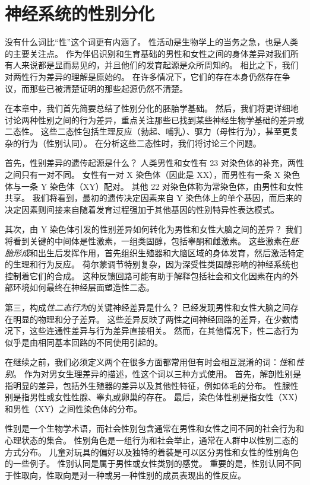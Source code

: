 \chapter{神经系统的性别分化} \label{chap:chap51}

没有什么词比“性”这个词更有内涵了。
性活动是生物学上的当务之急，也是人类的主要关注点。
作为伴侣识别和生育基础的男性和女性之间的身体差异对我们所有人来说都是显而易见的，并且他们的发育起源是众所周知的。
相比之下，我们对两性行为差异的理解是原始的。
在许多情况下，它们的存在本身仍然存在争议，而那些已被清楚证明的那些起源仍然不清楚。


在本章中，我们首先简要总结了性别分化的胚胎学基础。
然后，我们将更详细地讨论两种性别之间的行为差异，重点关注那些已找到某些神经生物学基础的差异或二态性。
这些二态性包括生理反应（勃起、哺乳）、驱力（母性行为），甚至更复杂的行为（性别认同）。
在分析这些二态性时，我们将讨论三个问题。


首先，性别差异的遗传起源是什么？
人类男性和女性有 23 对染色体的补充，两性之间只有一对不同。
女性有一对 X 染色体（因此是 XX），而男性有一条 X 染色体与一条 Y 染色体（XY）配对。
其他 22 对染色体称为常染色体，由男性和女性共享。
我们将看到，最初的遗传决定因素来自 Y 染色体上的单个基因，而后来的决定因素则间接来自随着发育过程强加于其他基因的性别特异性表达模式。


其次，由 Y 染色体引发的性别差异如何转化为男性和女性大脑之间的差异？
我们将看到关键的中间体是性激素，一组类固醇，包括睾酮和雌激素。
这些激素在\textit{胚胎形成}和出生后发挥作用，首先组织生殖器和大脑区域的身体发育，然后激活特定的生理和行为反应。
荷尔蒙调节特别复杂，因为深受性类固醇影响的神经系统也控制着它们的合成。
这种反馈回路可能有助于解释包括社会和文化因素在内的外部环境如何最终在神经层面塑造性二态。


第三，构成\textit{性二态行为}的关键神经差异是什么？
已经发现男性和女性大脑之间存在明显的物理和分子差异。
这些差异反映了两性之间神经回路的差异，在少数情况下，这些连通性差异与行为差异直接相关。
然而，在其他情况下，性二态行为似乎是由相同基本回路的不同使用引起的。


在继续之前，我们必须定义两个在很多方面都常用但有时会相互混淆的词：\textit{性}和\textit{性别}。
作为对男女生理差异的描述，性这个词以三种方式使用。
首先，解剖性别是指明显的差异，包括外生殖器的差异以及其他性特征，例如体毛的分布。
性腺性别是指男性或女性性腺、睾丸或卵巢的存在。
最后，染色体性别是指女性（XX）和男性（XY）之间性染色体的分布。


性别是一个生物学术语，而社会性别包含通常在男性和女性之间不同的社会行为和心理状态的集合。
性别角色是一组行为和社会举止，通常在人群中以性别二态的方式分布。
儿童对玩具的偏好以及独特的着装是可以区分男性和女性的性别角色的一些例子。
性别认同是属于男性或女性类别的感觉。
重要的是，性别认同不同于性取向，性取向是对一种或另一种性别的成员表现出的性反应。


